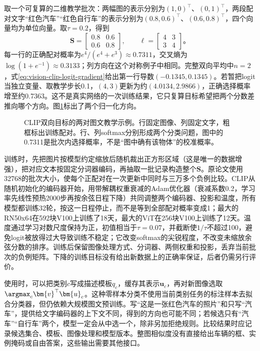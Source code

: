 取一个可复算的二维教学批次：两幅图的表示分别为$(1,0)^\top$、$(0,1)^\top$，两段配对文字“红色汽车”“红色自行车”的表示分别为$(0.8,0.6)^\top$、$(0.6,0.8)^\top$，四个向量均为单位向量。取$\tau=0.2$，得到
\[
  \bm{S}=\begin{bmatrix}0.8&0.6\\0.6&0.8\end{bmatrix},
  \qquad
  \bm{\ell}=\begin{bmatrix}4&3\\3&4\end{bmatrix}\text{。}
\]
每一行的正确配对概率为$e^4/(e^4+e^3)\approx0.7311$，交叉熵为$\log(1+e^{-1})\approx0.3133$；列方向在这个对称例子中相同。完整双向平均中$n=2$，式\eqref{eq:vision-clip-logit-gradient}给出第一行导数$(-0.1345,0.1345)$。若暂把logit当独立变量、取教学步长0.1，$(4,3)$更新为约$(4.0134,2.9866)$，正确选择概率增至约0.7363。这不是真实网络的一次训练结果，它只复算目标希望把两个分数差推向哪个方向。图\ref{fig:vision-clip-matrix}标出了两个归一化方向。

\begin{figure}[htbp]
  \centering
  
  \caption{CLIP双向目标的两对图文教学示例。行固定图像、列固定文字，粗框标出训练配对。行、列softmax分别形成两个分类问题，图中的0.7311是批次内选择概率，不是“图中确有该物体”的校准概率。}
  \label{fig:vision-clip-matrix}
\end{figure}

训练时，先把图片按模型约定缩放后随机裁出正方形区域（这是唯一的数据增强），把对应文本按固定分词器编码，再抽取一批记录构造整个$\bm S$。原论文使用32768的批次大小，使每个正配对在一次更新中同时与三万多个负例比较。CLIP从随机初始化的编码器开始，用带解耦权重衰减的Adam优化器（衰减系数0.2，学习率先线性预热2000步再按余弦日程下降）共同调整两个编码器、投影和温度，所有模型都训练32轮，按这一日程停止，而不是等到全部配对概率变成1；最大的RN50x64在592块V100上训练了18天，最大的ViT在256块V100上训练了12天。温度通过学习对数尺度保持为正，初值相当于$\tau=0.07$，并截断使$1/\tau$不超过100，避免logit被放得过大导致训练不稳定；它改变softmax的尖锐程度，不改变未缩放余弦分数的排序。训练后保留图像处理方式、分词器、两侧权重和投影，丢弃当前批次的负例矩阵。下降的训练目标没有给出新数据上的正确率保证，后者仍需另行评价。

使用时，可以把类别$c$写成描述模板$q_c$，缓存其表示$\bm{u}_c$，再对新图像选取$\argmax_c\bm{v}^\top\bm{u}_c$。这种零样本分类不使用当前类别任务的标注样本去拟合分类器，但仍依赖大规模图文预训练。写“这是一张红色汽车的照片”和只写“汽车”，提供给文字编码器的上下文不同，得到的方向也可能不同；若候选只有“汽车”“自行车”两个，模型一定会从中选一个，除非另加拒绝规则。比较结果时应记录候选集合、模板、图像处理和模型版本。整图相似度没有直接给出车辆的框、实例掩码或自由答案，这些输出需要其他接口。

